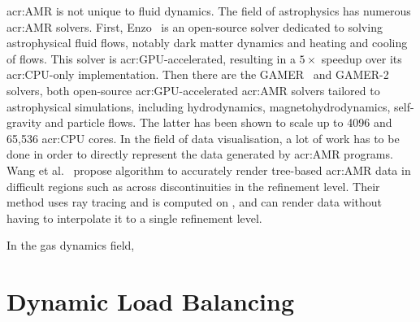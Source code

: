 \Acrlong{acr:AMR} is not unique to fluid dynamics. The field of astrophysics has numerous
\acrshort{acr:AMR} solvers. First, Enzo~\cite{Bryan2014} is an open-source solver dedicated to
solving astrophysical fluid flows, notably dark matter dynamics and heating and cooling of flows.
This solver is \acrshort{acr:GPU}-accelerated, resulting in a \(5 \times \) speedup over its
\acrshort{acr:CPU}-only implementation. Then there are the GAMER~\cite{Schive2010} and
GAMER-2~\cite{Schive2018} solvers, both open-source \acrshort{acr:GPU}-accelerated
\acrshort{acr:AMR} solvers tailored to astrophysical simulations, including hydrodynamics,
magnetohydrodynamics, self-gravity and particle flows. The latter has been shown to scale up to 4096
 and 65,536 \acrshort{acr:CPU} cores. In the field of data visualisation, a lot
of work has to be done in order to directly represent the data generated by \acrshort{acr:AMR}
programs. Wang et al.~\cite{Wang2020} propose algorithm to accurately render tree-based
\acrshort{acr:AMR} data in difficult regions such as across discontinuities in the refinement level.
Their method uses ray tracing and is computed on , and can render data without
having to interpolate it to a single refinement level.

In the gas dynamics field,
~\cite{Giuliani2019} %

\section{Dynamic Load Balancing}\label{section:literature_review:load_balancing}


~\cite{Karypis1997} %
~\cite{Karypis1997P} %

~\cite{MacNeice2000} %
~\cite{Peplinski2016} %
~\cite{Schive2018} %